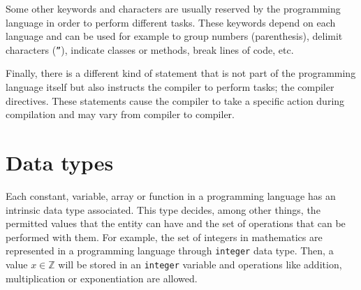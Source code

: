 Some other keywords and characters are usually reserved by the programming language in order to perform different tasks. 
These keywords depend on each language and can be used for example to 
group numbers (parenthesis), 
delimit characters (\texttt{''}), 
indicate classes or methods,
break lines of code, etc.

Finally, there is a different kind of statement that is not part of the programming language itself 
but also instructs the compiler to perform tasks; the compiler directives. 
These statements cause the compiler to take a specific action during compilation and may vary from compiler to compiler.












    \section{Data types} 
Each constant, variable, array or function in a programming language has an intrinsic data type associated. 
This type decides, among other things, the permitted values that the entity can have and the set of operations that can be performed with them.
For example, the set of integers in mathematics are represented in a programming language through \texttt{integer} data type. 
Then, a value $x\in \mathbb{Z}$ will be stored in an \texttt{integer} variable and operations like addition, multiplication or exponentiation are allowed. 

